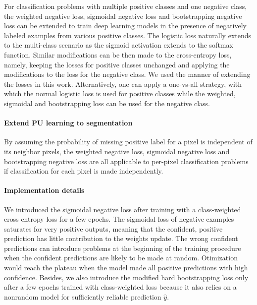 For classification problems with multiple positive classes and one negative class, the weighted negative loss, sigmoidal negative loss and bootstrapping negative loss can be extended to train deep learning models in the presence of negatively labeled examples from various positive classes.
The logistic loss naturally extends to the multi-class scenario as the sigmoid activation extends to the softmax function.
Similar modifications can be then made to the cross-entropy loss, namely, keeping the losses for positive classes unchanged and applying the modifications to the loss for the negative class.
We used the manner of extending the losses in this work.
Alternatively, one can apply a one-vs-all strategy, with which the normal logistic loss is used for positive classes while the weighted, sigmoidal and bootstrapping loss can be used for the negative class.

\paragraph{Extend PU learning to segmentation}

By assuming the probability of missing positive label for a pixel is independent of its neighbor pixels, the weighted negative loss, sigmoidal negative loss and bootstrapping negative loss are all applicable to per-pixel classification problems if classification for each pixel is made independently.


\paragraph{Implementation details}

We introduced the sigmoidal negative loss after training with a class-weighted cross entropy loss for a few epochs.
The sigmoidal loss of negative examples saturates for very positive outputs, meaning that the confident, positive prediction has little contribution to the weights update.
The wrong confident predictions can introduce problems at the beginning of the training procedure when the confident predictions are likely to be made at random.
Otimization would reach the plateau when the model made all positive predictions with high confidence.
Besides, we also introduce the modified hard bootstrapping loss only after a few epochs trained with class-weighted loss because it also relies on a nonrandom model for sufficiently reliable prediction $\hat{y}$.


